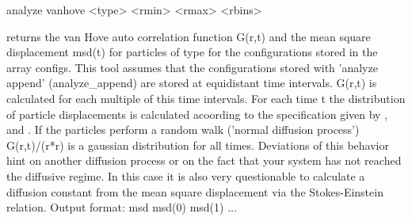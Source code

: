\begin{tclcode}
 analyze vanhove { <type> <rmin> <rmax> <rbins> } 
\end{tclcode}
returns the van Hove auto correlation function G(r,t) and the mean square displacement msd(t) for particles of type  for the configurations stored in the array configs. This tool assumes that the configurations stored with 'analyze append' (analyze\_append) are stored at equidistant time intervals. G(r,t) is calculated for each multiple of this time intervals. For each time t the distribution of particle displacements is calculated acoording to the specification given by ,  and . If the particles perform a random walk ('normal diffusion process') G(r,t)/(r*r) is a gaussian distribution for all times. Deviations of this behavior hint on another diffusion process or on the fact that your system has not reached the diffusive regime. In this case it is also very questionable to calculate a diffusion constant from the mean square displacement via the Stokes-Einstein relation.
Output format:
{ msd { msd(0) msd(1) ... } }
